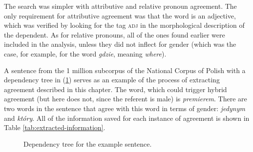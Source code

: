 The search was simpler with attributive and relative pronoun agreement. The only requirement for attributive agreement was that the word is an adjective, which was verified by looking for the tag \textsc{adj} in the morphological description of the dependent. As for relative pronouns, all of the ones found earlier were included in the analysis, unless they did not inflect for gender (which was the case, for example, for the word \textsl{gdzie}, meaning \textsl{where}). 

A sentence from the 1 million subcorpus of the National Corpus of Polish with a dependency tree in (\ref{tree}) serves as an example of the process of extracting agreement described in this chapter. The word, which could trigger hybrid agreement (but here does not, since the referent is male) is \textsl{premierem}. There are two words in the sentence that agree with this word in terms of gender: \textsl{jedynym} and \textsl{który}. All of the information saved for each instance of agreement is shown in Table \ref{tab:extracted-information}.

\begin{figure}
  \centering
  \caption*{``It's not true, that prime minister Jerzy Buzek is the only one that has appeared in the Senate.''}
\caption{Dependency tree for the example sentence.}
\label{tree}
\end{figure}


